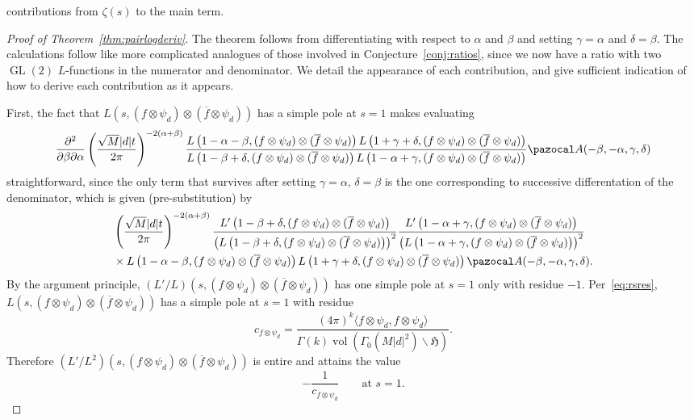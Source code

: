 \documentclass[11pt,reqno]{amsart} \usepackage{fullpage}
\newcommand\be{\begin{equation}}
\newcommand\ee{\end{equation}}
\renewcommand{\H}{\mathfrak{H}}
\newcommand{\GL}{\operatorname{GL}}
\numberwithin{equation}{section}
\begin{document}
contributions from $\zeta(s)$ to the main term.
\begin{proof}[Proof of Theorem~\ref{thm:pairlogderiv}]
  The theorem follows from differentiating with respect to $\alpha$ and $\beta$ and setting
  $\gamma=\alpha$ and $\delta=\beta$. The calculations follow like more complicated
  analogues of those involved in Conjecture~\ref{conj:ratios}, since we now have a ratio
  with two $\GL(2)$ $L$-functions in the numerator and denominator.
  We detail the appearance of each contribution, and give sufficient indication of how to
  derive each contribution as it appears.

  First, the fact that $L(s,(f\otimes\psi_d)\otimes(\overline f\otimes\psi_d))$ has
  a simple pole at $s=1$ makes evaluating
  \be\frac{\partial^2}{\partial\beta\partial\alpha}
  \left(\frac{\sqrt M|d|t}{2\pi}\right)^{-2(\alpha+\beta)}
  \frac{L\left(1-\alpha-\beta,(f\otimes\psi_d)\otimes(\overline f\otimes\psi_d)\right)
    L\left(1+\gamma+\delta,(f\otimes\psi_d)\otimes(\overline f\otimes\psi_d)\right)}
  {L\left(1-\beta+\delta,(f\otimes\psi_d)\otimes(\overline f\otimes\psi_d)\right)
    L\left(1-\alpha+\gamma,(f\otimes\psi_d)\otimes(\overline f\otimes\psi_d)\right)}
  \pazocal A(-\beta,-\alpha,\gamma,\delta)\ee
  straightforward, since the only term that survives after setting $\gamma=\alpha$,
  $\delta=\beta$ is the one corresponding to successive differentation of the denominator,
  which is given (pre-substitution) by
  \be\begin{aligned}[t]&
    \left(\frac{\sqrt M|d|t}{2\pi}\right)^{-2(\alpha+\beta)}
    \frac{L'\left(1-\beta+\delta,(f\otimes\psi_d)\otimes(\overline f\otimes\psi_d)\right)}
    {\left(L\left(1-\beta+\delta,(f\otimes\psi_d)\otimes(\overline f\otimes\psi_d)\right)\right)^2}
    \frac{L'\left(1-\alpha+\gamma,(f\otimes\psi_d)\otimes(\overline f\otimes\psi_d)\right)}
    {\left(L\left(1-\alpha+\gamma,(f\otimes\psi_d)\otimes(\overline f\otimes\psi_d)\right)\right)^2} \\
    &\times L\left(1-\alpha-\beta,(f\otimes\psi_d)\otimes(\overline f\otimes\psi_d)\right)
    L\left(1+\gamma+\delta,(f\otimes\psi_d)\otimes(\overline f\otimes\psi_d)\right)    
    \pazocal A(-\beta,-\alpha,\gamma,\delta).\end{aligned}\ee
  By the argument principle,
  $\left(L'/L\right)\left(s,(f\otimes\psi_d)\otimes(\overline f\otimes\psi_d)\right)$
  has one simple pole at $s=1$ only with residue $-1$. Per~\eqref{eq:rsres},
  $L(s,(f\otimes\psi_d)\otimes(\overline f\otimes\psi_d))$ has a simple pole at $s=1$
  with residue
  \be\label{eq:twistedrsres}c_{f\otimes\psi_d}
  =\frac{(4\pi)^k\langle f\otimes\psi_d,f\otimes\psi_d\rangle}
  {\Gamma(k)\operatorname{vol}(\Gamma_0(M|d|^2)\backslash\H)}.\ee Therefore
  $\left(L'/L^2\right)\left(s,(f\otimes\psi_d)\otimes(\overline f\otimes\psi_d)\right)$ is
  entire and attains the value \be-\frac1{c_{f\otimes\psi_d}}\qquad\text{at $s=1$.}\ee


\end{proof}
\end{document}
